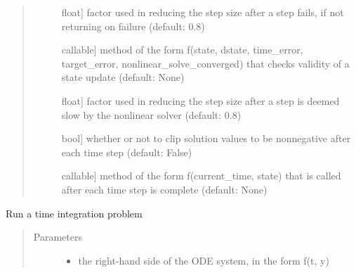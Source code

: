 \documentclass[letterpaper,10pt,english]{sphinxmanual}
\begin{document}
\begin{fulllineitems}
\begin{quote}
\begin{description}
\begin{description}
\item[{}] \leavevmode{[}float{]}
factor used in reducing the step size after a step fails, if not returning on failure (default: 0.8)

\item[{}] \leavevmode{[}callable{]}
method of the form f(state, dstate, time\_error, target\_error, nonlinear\_solve\_converged) that checks validity of a state update (default: None)

\item[{}] \leavevmode{[}float{]}
factor used in reducing the step size after a step is deemed slow by the nonlinear solver (default: 0.8)

\item[{}] \leavevmode{[}bool{]}
whether or not to clip solution values to be nonnegative after each time step (default: False)

\item[{}] \leavevmode{[}callable{]}
method of the form f(current\_time, state) that is called after each time step is complete (default: None)

\end{description}

\end{description}\end{quote}

\begin{fulllineitems}
\label{\detokenize{spitfire.time.governor:spitfire.time.governor.Governor.integrate}}
Run a time integration problem
\begin{quote}\begin{description}
\item[{Parameters}] \leavevmode\begin{itemize}
\item {} 
 \textendash{} the right-hand side of the ODE system, in the form f(t, y)


\end{itemize}
\end{description}
\end{quote}
\end{fulllineitems}
\end{fulllineitems}
\end{document}
